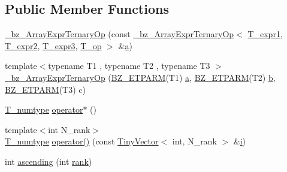 \subsection*{Public Member Functions}
\begin{DoxyCompactItemize}
\item 
\hyperlink{class__bz__ArrayExprTernaryOp_abfaf20ad8f6a962c59fd8b8e8d85096a}{\+\_\+bz\+\_\+\+Array\+Expr\+Ternary\+Op} (const \hyperlink{class__bz__ArrayExprTernaryOp}{\+\_\+bz\+\_\+\+Array\+Expr\+Ternary\+Op}$<$ \hyperlink{class__bz__ArrayExprTernaryOp_af7fa0e8d4f015bc9ab42313078639196}{T\+\_\+expr1}, \hyperlink{class__bz__ArrayExprTernaryOp_a392ed3a88602f5352a558ce6277cde22}{T\+\_\+expr2}, \hyperlink{class__bz__ArrayExprTernaryOp_a809b1acdc0c2ffe359711f40d2688526}{T\+\_\+expr3}, \hyperlink{class__bz__ArrayExprTernaryOp_a41b68c1cd14a31c2ce465fe3d75ebccc}{T\+\_\+op} $>$ \&\hyperlink{gen__mat5files_8m_aae328bf20413f220e38aec4d95bfd6da}{a})
\item 
{\footnotesize template$<$typename T1 , typename T2 , typename T3 $>$ }\\\hyperlink{class__bz__ArrayExprTernaryOp_abcfabd17d10b2a657581ad5547d9a588}{\+\_\+bz\+\_\+\+Array\+Expr\+Ternary\+Op} (\hyperlink{tuning_8h_a92a6f3aa8f4cd5ac9b4239c449892bb7}{B\+Z\+\_\+\+E\+T\+P\+A\+R\+M}(T1) \hyperlink{gen__mat5files_8m_aae328bf20413f220e38aec4d95bfd6da}{a}, \hyperlink{tuning_8h_a92a6f3aa8f4cd5ac9b4239c449892bb7}{B\+Z\+\_\+\+E\+T\+P\+A\+R\+M}(T2) \hyperlink{gen__mat5files_8m_a7b38767b3b6a8dae167e5afa4fc340b0}{b}, \hyperlink{tuning_8h_a92a6f3aa8f4cd5ac9b4239c449892bb7}{B\+Z\+\_\+\+E\+T\+P\+A\+R\+M}(T3) c)
\item 
\hyperlink{class__bz__ArrayExprTernaryOp_a9a66d06520e4d8bedb6c754d3f106949}{T\+\_\+numtype} \hyperlink{class__bz__ArrayExprTernaryOp_acd53c0142741e16b0693dbf69324c1e0}{operator$\ast$} ()
\item 
{\footnotesize template$<$int N\+\_\+rank$>$ }\\\hyperlink{class__bz__ArrayExprTernaryOp_a9a66d06520e4d8bedb6c754d3f106949}{T\+\_\+numtype} \hyperlink{class__bz__ArrayExprTernaryOp_a2657f0153ad2e4d8991eade1b8d6d291}{operator()} (const \hyperlink{classTinyVector}{Tiny\+Vector}$<$ int, N\+\_\+rank $>$ \&\hyperlink{indexexpr_8h_aabd77643995707c185e95c8cb2782c81}{i})
\item 
int \hyperlink{class__bz__ArrayExprTernaryOp_a0e06b5101e2b484e99075635569c23da}{ascending} (int \hyperlink{class__bz__ArrayExprTernaryOp_afdb88cf98214c518580dcbc5ee7ad256}{rank})
\item 

\end{DoxyCompactItemize}
